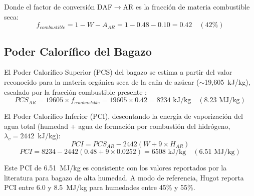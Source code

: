 Donde el factor de conversión DAF$\rightarrow$AR es la fracción de materia combustible seca:
\begin{equation}
	f_{combustible} = 1 - W - A_{AR} = 1 - 0.48 - 0.10 = 0.42 \quad (42\%)
\end{equation}

\subsection{Poder Calorífico del Bagazo}

El Poder Calorífico Superior (PCS) del bagazo se estima a partir del valor reconocido para la materia orgánica seca de la caña de azúcar ($\sim$19{,}605~kJ/kg), escalado por la fracción combustible presente \cite{hugot1986}:
\begin{equation}
	PCS_{AR} = 19605 \times f_{combustible} = 19605 \times 0.42 = 8234 \text{ kJ/kg} \quad (8.23 \text{ MJ/kg})
\end{equation}

El Poder Calorífico Inferior (PCI), descontando la energía de vaporización del agua total (humedad + agua de formación por combustión del hidrógeno, $\lambda_v = 2442$~kJ/kg):
\begin{equation}
	PCI = PCS_{AR} - 2442 \left( W + 9 \times H_{AR} \right)
\end{equation}
\begin{equation}
	PCI = 8234 - 2442(0.48 + 9 \times 0.0252) = 6508 \text{ kJ/kg} \quad (6.51 \text{ MJ/kg})
\end{equation}

Este PCI de 6.51~MJ/kg es consistente con los valores reportados por la literatura para bagazo de alta humedad. A modo de referencia, Hugot \cite{hugot1986} reporta PCI entre 6.0 y 8.5~MJ/kg para humedades entre 45\% y 55\%.
